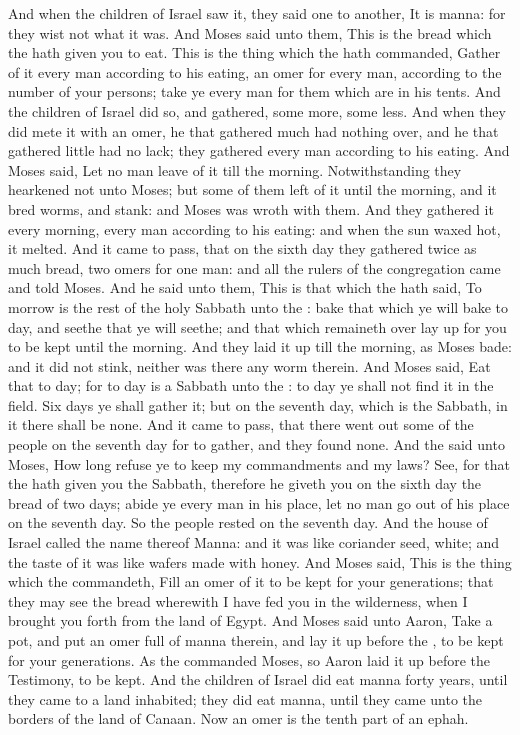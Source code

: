 \begin{biblechapter}
\verse And when the children of Israel saw it, they said one to another, It is manna: for they wist not what it was. And Moses said unto them, This is the bread which the \LORD hath given you to eat.
\verse This is the thing which the \LORD hath commanded, Gather of it every man according to his eating, an omer for every man, according to the number of your persons; take ye every man for them which are in his tents.
\verse And the children of Israel did so, and gathered, some more, some less.
\verse And when they did mete it with an omer, he that gathered much had nothing over, and he that gathered little had no lack; they gathered every man according to his eating.
\verse And Moses said, Let no man leave of it till the morning.
\verse Notwithstanding they hearkened not unto Moses; but some of them left of it until the morning, and it bred worms, and stank: and Moses was wroth with them.
\verse And they gathered it every morning, every man according to his eating: and when the sun waxed hot, it melted.
\verse And it came to pass, that on the sixth day they gathered twice as much bread, two omers for one man: and all the rulers of the congregation came and told Moses.
\verse And he said unto them, This is that which the \LORD hath said, To morrow is the rest of the holy Sabbath unto the \LORD: bake that which ye will bake to day, and seethe that ye will seethe; and that which remaineth over lay up for you to be kept until the morning.
\verse And they laid it up till the morning, as Moses bade: and it did not stink, neither was there any worm therein.
\verse And Moses said, Eat that to day; for to day is a Sabbath unto the \LORD: to day ye shall not find it in the field.
\verse Six days ye shall gather it; but on the seventh day, which is the Sabbath, in it there shall be none.
\verse And it came to pass, that there went out some of the people on the seventh day for to gather, and they found none.
\verse And the \LORD said unto Moses, How long refuse ye to keep my commandments and my laws?
\verse See, for that the \LORD hath given you the Sabbath, therefore he giveth you on the sixth day the bread of two days; abide ye every man in his place, let no man go out of his place on the seventh day.
\verse So the people rested on the seventh day.
\verse And the house of Israel called the name thereof Manna: and it was like coriander seed, white; and the taste of it was like wafers made with honey.
\verse And Moses said, This is the thing which the \LORD commandeth, Fill an omer of it to be kept for your generations; that they may see the bread wherewith I have fed you in the wilderness, when I brought you forth from the land of Egypt.
\verse And Moses said unto Aaron, Take a pot, and put an omer full of manna therein, and lay it up before the \LORD, to be kept for your generations.
\verse As the \LORD commanded Moses, so Aaron laid it up before the Testimony, to be kept.
\verse And the children of Israel did eat manna forty years, until they came to a land inhabited; they did eat manna, until they came unto the borders of the land of Canaan.
\verse Now an omer is the tenth part of an ephah.
\end{biblechapter}

